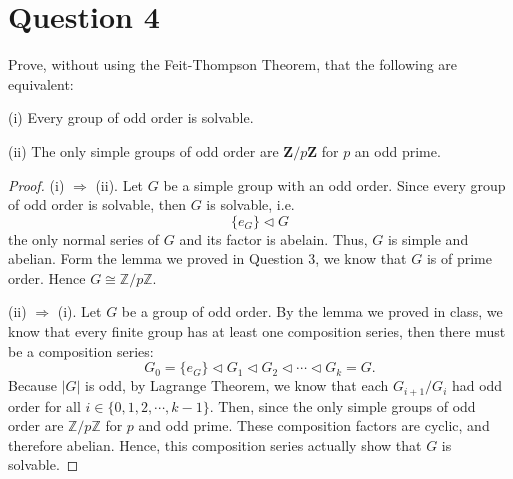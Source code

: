 \section{Question 4}

\begin{question}
    Prove, without using the Feit-Thompson Theorem, that the following are equivalent:
    
    (i) Every group of odd order is solvable.
    
    (ii) The only simple groups of odd order are $\mathbf{Z} / p \mathbf{Z}$ for $p$ an odd prime.
\end{question}

\begin{answer}
    \begin{proof}
        (i) $\Rightarrow$ (ii). Let $G$ be a simple group with an odd order. Since every group of odd order is solvable, then $G$ is solvable, i.e.
        \begin{equation}
            \{e_G\} \triangleleft G
        \end{equation}
        the only normal series of $G$ and its factor is abelain. Thus, $G$ is simple and abelian. Form the lemma we proved in Question 3, we know that $G$ is of prime order. Hence $G \cong \mathbb{Z}/p\mathbb{Z}$.
        
        (ii) $\Rightarrow$ (i). Let $G$ be a group of odd order. By the lemma we proved in class, we know that every finite group has at least one composition series, then there must be a composition series:
        \begin{equation}
            G_0 = \{e_G\} \triangleleft G_1 \triangleleft G_2 \triangleleft \cdots \triangleleft G_k = G.
        \end{equation}
        Because $\lvert G \rvert$ is odd, by Lagrange Theorem, we know that each $G_{i+1}/G_{i}$ had odd order for all $i \in \{0,1,2,\cdots,k-1\}$. Then, since the only simple groups of odd order are $\mathbb{Z}/p\mathbb{Z}$ for $p$ and odd prime. These composition factors are cyclic, and therefore abelian. Hence, this composition series actually show that $G$ is solvable.
    \end{proof}
\end{answer}